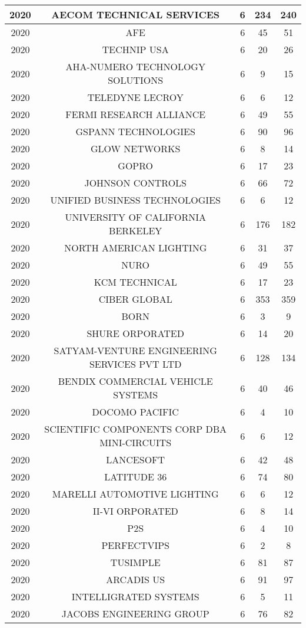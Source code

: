 \documentclass{article}%
\begin{document}
\begin{longtable}{c|c|c|c|c}
\hline%
2020&AECOM TECHNICAL SERVICES&6&234&240\\%
\hline%
2020&AFE&6&45&51\\%
\hline%
2020&TECHNIP USA&6&20&26\\%
\hline%
2020&AHA{-}NUMERO TECHNOLOGY SOLUTIONS&6&9&15\\%
\hline%
2020&TELEDYNE LECROY&6&6&12\\%
\hline%
2020&FERMI RESEARCH ALLIANCE&6&49&55\\%
\hline%
2020&GSPANN TECHNOLOGIES&6&90&96\\%
\hline%
2020&GLOW NETWORKS&6&8&14\\%
\hline%
2020&GOPRO&6&17&23\\%
\hline%
2020&JOHNSON CONTROLS&6&66&72\\%
\hline%
2020&UNIFIED BUSINESS TECHNOLOGIES&6&6&12\\%
\hline%
2020&UNIVERSITY OF CALIFORNIA BERKELEY&6&176&182\\%
\hline%
2020&NORTH AMERICAN LIGHTING&6&31&37\\%
\hline%
2020&NURO&6&49&55\\%
\hline%
2020&KCM TECHNICAL&6&17&23\\%
\hline%
2020&CIBER GLOBAL&6&353&359\\%
\hline%
2020&BORN&6&3&9\\%
\hline%
2020&SHURE ORPORATED&6&14&20\\%
\hline%
2020&SATYAM{-}VENTURE ENGINEERING SERVICES PVT LTD&6&128&134\\%
\hline%
2020&BENDIX COMMERCIAL VEHICLE SYSTEMS&6&40&46\\%
\hline%
2020&DOCOMO PACIFIC&6&4&10\\%
\hline%
2020&SCIENTIFIC COMPONENTS CORP DBA MINI{-}CIRCUITS&6&6&12\\%
\hline%
2020&LANCESOFT&6&42&48\\%
\hline%
2020&LATITUDE 36&6&74&80\\%
\hline%
2020&MARELLI AUTOMOTIVE LIGHTING&6&6&12\\%
\hline%
2020&II{-}VI ORPORATED&6&8&14\\%
\hline%
2020&P2S&6&4&10\\%
\hline%
2020&PERFECTVIPS&6&2&8\\%
\hline%
2020&TUSIMPLE&6&81&87\\%
\hline%
2020&ARCADIS US&6&91&97\\%
\hline%
2020&INTELLIGRATED SYSTEMS&6&5&11\\%
\hline%
2020&JACOBS ENGINEERING GROUP&6&76&82\\%

\end{longtable}
\end{document}
